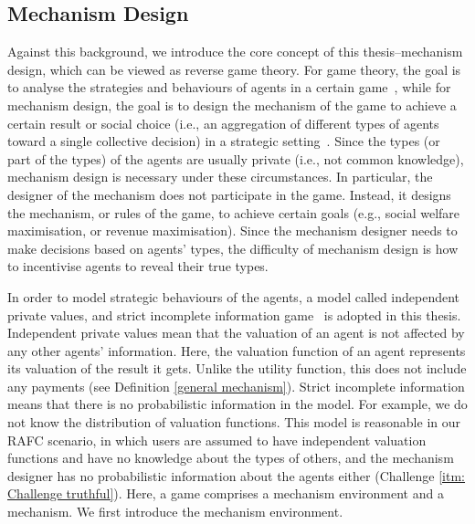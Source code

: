 \documentclass[11pt]{phdthesis}
\begin{document}
\subsection{Mechanism Design} \label{mechanism design}

Against this background, we introduce the core concept of this thesis–mechanism design, which can be viewed as reverse game theory. For game theory, the goal is to analyse the strategies and behaviours of agents in a certain game~\citep{roger1991game}, while for mechanism design, the goal is to design the mechanism of the game to achieve a certain result or social choice (i.e., an aggregation of different types of agents toward a single collective decision) in a strategic setting~\citep{nisan2007algorithmic}. Since the types (or part of the types) of the agents are usually private (i.e., not common knowledge), mechanism design is necessary under these circumstances. In particular, the designer of the mechanism does not participate in the game. Instead, it designs the mechanism, or rules of the game, to achieve certain goals (e.g., social welfare maximisation, or revenue maximisation). Since the mechanism designer needs to make decisions based on agents' types, the difficulty of mechanism design is how to incentivise agents to reveal their true types. 

In order to model strategic behaviours of the agents, a model called independent private values, and strict incomplete information game~\citep[Chapter 9]{nisan2007algorithmic} is adopted in this thesis. Independent private values mean that the valuation of an agent is not affected by any other agents' information. Here, the valuation function of an agent represents its valuation of the result it gets. Unlike the utility function, this does not include any payments (see Definition \ref{general mechanism}). 
Strict incomplete information means that there is no probabilistic information in the model. For example, we do not know the distribution of valuation functions. This model is reasonable in our RAFC scenario, in which users are assumed to have independent valuation functions and have no knowledge about the types of others, and the mechanism designer has no probabilistic information about the agents either (Challenge \ref{itm: Challenge truthful}). Here, a game comprises a mechanism environment and a mechanism. We first introduce the mechanism environment.
\end{document}
